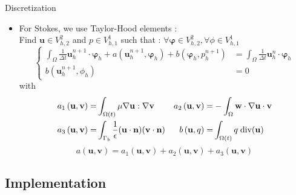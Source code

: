 \begin{frame}{Discretization}
  \begin{itemize}
  \item
    For Stokes, we use Taylor-Hood elements :\\
    Find $\mathbf{u}\in V_{h,2}^2$ and $p\in V_{h,1}^1$ such that : $\forall \bm{\varphi}\in V_{h,2}^2, \forall \phi\in V_{h,1}^1$
  \begin{equation*}
    \left\{
    \begin{aligned}
      \int_\Omega \frac{1}{\Delta t}\mathbf{u}^{n+1}_h\cdot\bm{\varphi}_h
      + a(\mathbf{u}^{n+1}_h,\bm{\varphi}_h) + b\left(\bm{\varphi}_h,p^{n+1}_h\right) 
      &=\int_\Omega \frac{1}{\Delta t}\mathbf{u}^n_h\cdot\bm{\varphi}_h\\
      b(\mathbf{u}^{n+1}_h,\phi_h) &= 0
    \end{aligned}
    \right.
  \end{equation*}
  with
  \begin{align*}
    a_1\left(\mathbf{u},\mathbf{v}\right) =& \int_{\Omega(t)} \mu \nabla \mathbf{u} : \nabla \mathbf{v}
    & a_2\left(\mathbf{u},\mathbf{v}\right) =&  - \int_\Omega \mathbf{w}\cdot\nabla\mathbf{u}\cdot\mathbf{v}\\
    a_3\left(\mathbf{u},\mathbf{v}\right) =& \int_{\Gamma_b} \frac{1}{\epsilon}(\mathbf{u}\cdot\mathbf{n})(\mathbf{v}\cdot\mathbf{n})
    & b\left( \mathbf{u} , q \right) =&\int_{\Omega(t)} q\; \hbox{div} (\mathbf{u})
  \end{align*}
  \begin{equation*}
    a\left(\mathbf{u},\mathbf{v}\right) = a_1\left(\mathbf{u},\mathbf{v}\right) + a_2\left(\mathbf{u},\mathbf{v}\right) + a_3\left(\mathbf{u},\mathbf{v}\right)
  \end{equation*}
  \end{itemize}
\end{frame}

\subsection{Implementation}


